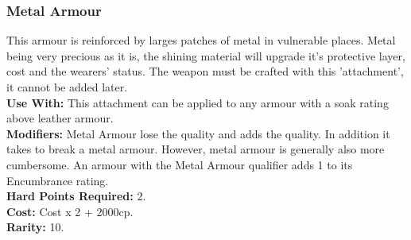 \subsubsection{Metal Armour}
This armour is reinforced by larges patches of metal in vulnerable places. Metal
being very precious as it is, the shining material will upgrade it's protective
layer, cost and the wearers' status. The weapon must be crafted with this 'attachment', it
cannot be added later.\\
\textbf{Use With:} This attachment can be applied to any armour with a soak rating above leather armour.\\
\textbf{Modifiers:} Metal Armour lose the  quality and adds the  quality.
    In addition it takes \despair\despair to break a metal armour.
    However, metal armour is generally also more cumbersome. An armour with the Metal
    Armour qualifier adds 1 to its Encumbrance rating.\\
\textbf{Hard Points Required:} 2.\\
\textbf{Cost:} Cost x 2 + 2000cp.\\
\textbf{Rarity:} 10.\\
